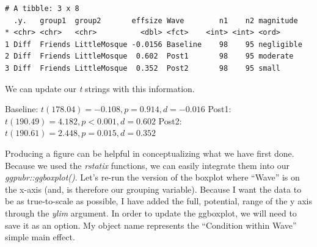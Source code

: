 \documentclass[
  11pt,
]{book}
\begin{document}
\begin{verbatim}
# A tibble: 3 x 8
  .y.   group1  group2       effsize Wave        n1    n2 magnitude 
* <chr> <chr>   <chr>          <dbl> <fct>    <int> <int> <ord>     
1 Diff  Friends LittleMosque -0.0156 Baseline    98    95 negligible
2 Diff  Friends LittleMosque  0.602  Post1       98    95 moderate  
3 Diff  Friends LittleMosque  0.352  Post2       98    95 small     
\end{verbatim}

We can update our \emph{t} strings with this information.

Baseline: \(t(178.04) = -0.108, p = 0.914, d = -0.016\) Post1: \(t(190.49) = 4.182, p < 0.001, d = 0.602\) Post2: \(t(190.61) = 2.448, p = 0.015, d = 0.352\)

Producing a figure can be helpful in conceptualizing what we have first done. Because we used the \emph{rstatix} functions, we can easily integrate them into our \emph{ggpubr::ggboxplot()}. Let's re-run the version of the boxplot where ``Wave'' is on the x-axis (and, is therefore our grouping variable). Because I want the data to be as true-to-scale as possible, I have added the full, potential, range of the y axis through the \emph{ylim} argument. In order to update the ggboxplot, we will need to save it as an option. My object name represents the ``Condition within Wave'' simple main effect.
\end{document}
